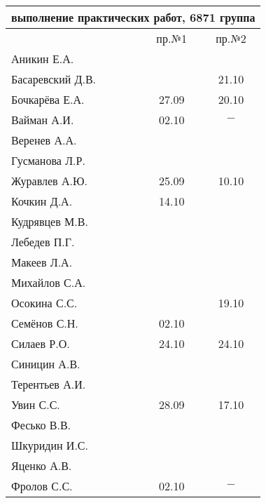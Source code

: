 \documentclass[a4paper,landscape,11pt]{article}
\begin{document}
\begin{tabular}{l|cc}
\multicolumn{3}{c}{выполнение практических работ, 6871 группа} \\
\toprule
& пр.№1 & пр.№2 \\
\midrule
Аникин Е.А.     &     &\\    
Басаревский Д.В.&     &21.10\\
Бочкарёва Е.А.  &27.09&20.10\\
Вайман А.И.     &02.10&$-$\\
Веренев А.А.    &     &\\
Гусманова Л.Р.  &     &\\
Журавлев А.Ю.   &25.09&10.10\\
Кочкин Д.А.     &14.10&\\
Кудрявцев М.В.  &     &\\
Лебедев П.Г.    &     &\\
Макеев Л.А.     &     &\\
Михайлов С.А.   &     &\\
Осокина С.С.    &     &19.10\\
Семёнов С.Н.    &02.10&\\
Силаев Р.О.     &24.10&24.10\\
Синицин А.В.    &     &\\
Терентьев А.И.  &     &\\
Увин С.С.       &28.09&17.10\\
Фесько В.В.     &     &\\
Шкуридин И.С.   &     &\\
Яценко А.В.     &     &\\
Фролов С.С.     &02.10&$-$\\
\bottomrule
\end{tabular}
\end{document}
